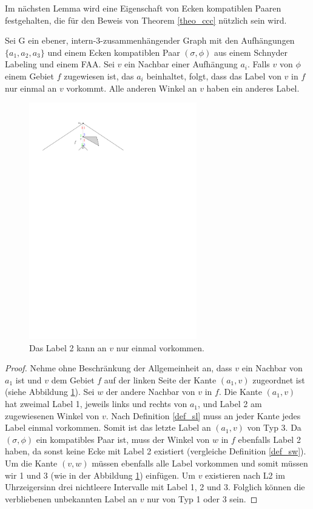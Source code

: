 Im nächsten Lemma wird eine Eigenschaft von Ecken kompatiblen Paaren festgehalten, die für den Beweis von Theorem \ref{theo_ccc} nützlich sein wird.

\begin{lemma}\label{lem4}
Sei G ein ebener, intern-3-zusammenhängender Graph mit den Aufhängungen $\{a_1,a_2,a_3\}$ und einem Ecken kompatiblen Paar $(\sigma,\phi)$ aus einem Schnyder Labeling und einem FAA. Sei $v$ ein Nachbar einer Aufhängung $a_i$. Falls $v$ von $\phi$ einem Gebiet $f$ zugewiesen ist, das $a_i$ beinhaltet, folgt, dass das Label von $v$ in $f$ nur einmal an $v$ vorkommt. Alle anderen Winkel an $v$ haben ein anderes Label.
\end{lemma}

\begin{figure}
\centering
\includegraphics[width=0.65\textwidth]{lem4.pdf}
\caption{Das Label 2 kann an $v$ nur einmal vorkommen.}
\label{pic_lem4}
\centering
\end{figure}

\begin{proof}
Nehme ohne Beschränkung der Allgemeinheit an, dass $v$ ein Nachbar von $a_1$ ist und $v$ dem Gebiet $f$ auf der linken Seite der Kante $(a_1,v)$ zugeordnet ist (siehe Abbildung \ref{pic_lem4}). Sei $w$ der andere Nachbar von $v$ in $f$. Die Kante $(a_1,v)$ hat zweimal Label 1, jeweils links und rechts von $a_1$, und Label 2 am zugewiesenen Winkel von $v$. Nach Definition \ref{def_sl} muss an jeder Kante jedes Label einmal vorkommen. Somit ist das letzte Label an $(a_1,v)$ von Typ 3. Da $(\sigma,\phi)$ ein kompatibles Paar ist, muss der Winkel von $w$ in $f$ ebenfalls Label 2 haben, da sonst keine Ecke mit Label 2 existiert (vergleiche Definition \ref{def_sw}). Um die Kante $(v,w)$ müssen ebenfalls alle Label vorkommen und somit müssen wir 1 und 3 (wie in der Abbildung \ref{pic_lem4}) einfügen. Um $v$ existieren nach L2 im Uhrzeigersinn drei nichtleere Intervalle mit Label 1, 2 und 3. Folglich können die verbliebenen unbekannten Label an $v$ nur von Typ 1 oder 3 sein.
\end{proof}

